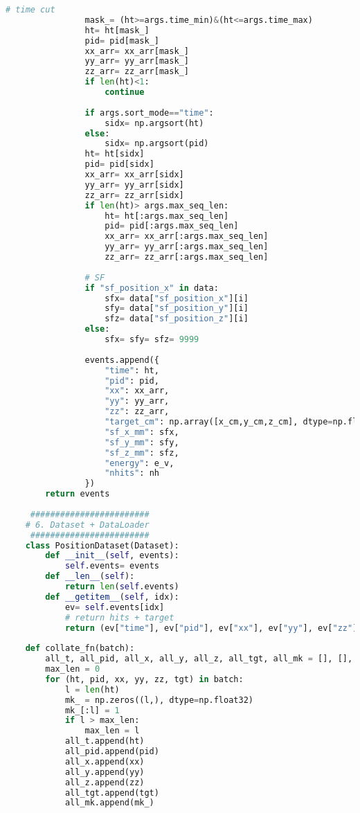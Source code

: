 \begin{lstlisting}[language=Python, caption={模型训练、验证与测试对比脚本 (train\_val\_test\_compare\_v1.py)}, label={lst:train_script}]
                # time cut
                mask_= (ht>=args.time_min)&(ht<=args.time_max)
                ht= ht[mask_]
                pid= pid[mask_]
                xx_arr= xx_arr[mask_]
                yy_arr= yy_arr[mask_]
                zz_arr= zz_arr[mask_]
                if len(ht)<1:
                    continue
    
                if args.sort_mode=="time":
                    sidx= np.argsort(ht)
                else:
                    sidx= np.argsort(pid)
                ht= ht[sidx]
                pid= pid[sidx]
                xx_arr= xx_arr[sidx]
                yy_arr= yy_arr[sidx]
                zz_arr= zz_arr[sidx]
                if len(ht)> args.max_seq_len:
                    ht= ht[:args.max_seq_len]
                    pid= pid[:args.max_seq_len]
                    xx_arr= xx_arr[:args.max_seq_len]
                    yy_arr= yy_arr[:args.max_seq_len]
                    zz_arr= zz_arr[:args.max_seq_len]
    
                # SF
                if "sf_position_x" in data:
                    sfx= data["sf_position_x"][i]
                    sfy= data["sf_position_y"][i]
                    sfz= data["sf_position_z"][i]
                else:
                    sfx= sfy= sfz= 9999
    
                events.append({
                    "time": ht,
                    "pid": pid,
                    "xx": xx_arr,
                    "yy": yy_arr,
                    "zz": zz_arr,
                    "target_cm": np.array([x_cm,y_cm,z_cm], dtype=np.float32),
                    "sf_x_mm": sfx,
                    "sf_y_mm": sfy,
                    "sf_z_mm": sfz,
                    "energy": e_v,
                    "nhits": nh
                })
        return events
    
     ########################
    # 6. Dataset + DataLoader
     ########################
    class PositionDataset(Dataset):
        def __init__(self, events):
            self.events= events
        def __len__(self):
            return len(self.events)
        def __getitem__(self, idx):
            ev= self.events[idx]
            # return hits + target
            return (ev["time"], ev["pid"], ev["xx"], ev["yy"], ev["zz"], ev["target_cm"])
    
    def collate_fn(batch):
        all_t, all_pid, all_x, all_y, all_z, all_tgt, all_mk = [], [], [], [], [], [], []
        max_len = 0
        for (ht, pid, xx, yy, zz, tgt) in batch:
            l = len(ht)
            mk_ = np.zeros((l,), dtype=np.float32)
            mk_[:l] = 1
            if l > max_len:
                max_len = l
            all_t.append(ht)
            all_pid.append(pid)
            all_x.append(xx)
            all_y.append(yy)
            all_z.append(zz)
            all_tgt.append(tgt)
            all_mk.append(mk_)
    

\end{lstlisting}
